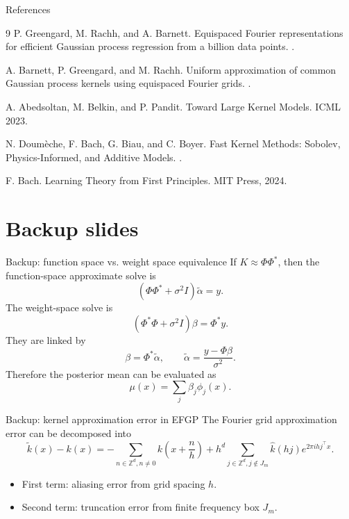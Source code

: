 \documentclass[aspectratio=169,10pt]{beamer}
\newcommand{\sig}{\sigma^2}
\begin{document}
\begin{frame}[allowframebreaks]{References}
\small
\begin{thebibliography}{9}
P. Greengard, M. Rachh, and A. Barnett.
\newblock Equispaced Fourier representations for efficient Gaussian process regression from a billion data points.
.

A. Barnett, P. Greengard, and M. Rachh.
\newblock Uniform approximation of common Gaussian process kernels using equispaced Fourier grids.
.

A. Abedsoltan, M. Belkin, and P. Pandit.
\newblock Toward Large Kernel Models.
\newblock ICML 2023.

N. Doum\`eche, F. Bach, G. Biau, and C. Boyer.
\newblock Fast Kernel Methods: Sobolev, Physics-Informed, and Additive Models.
.

F. Bach.
\newblock Learning Theory from First Principles.
\newblock MIT Press, 2024.
\end{thebibliography}
\end{frame}

\appendix
\section{Backup slides}

\begin{frame}{Backup: function space vs. weight space equivalence}
If $K\approx \Phi\Phi^*$, then the function-space approximate solve is
\[
(\Phi\Phi^*+\sig I)\tilde\alpha=y.
\]
The weight-space solve is
\[
(\Phi^*\Phi+\sig I)\beta=\Phi^*y.
\]
They are linked by
\[
\beta=\Phi^*\tilde\alpha,
\qquad
\tilde\alpha=\frac{y-\Phi\beta}{\sig}.
\]
Therefore the posterior mean can be evaluated as
\[
\mu(x)=\sum_j \beta_j\phi_j(x).
\]
\end{frame}

\begin{frame}{Backup: kernel approximation error in EFGP}
The Fourier grid approximation error can be decomposed into
\[
\tilde{k}(x)-k(x)
= -\sum_{n\in\mathbb{Z}^d,n\ne 0} k\!\left(x+\frac{n}{h}\right)
+ h^d\sum_{j\in\mathbb{Z}^d,j\notin J_m}\widehat{k}(hj)e^{2\pi i h j^\top x}.
\]

\begin{itemize}
  \item First term: aliasing error from grid spacing $h$.
  \item Second term: truncation error from finite frequency box $J_m$.
\end{itemize}
\end{frame}
\end{document}
